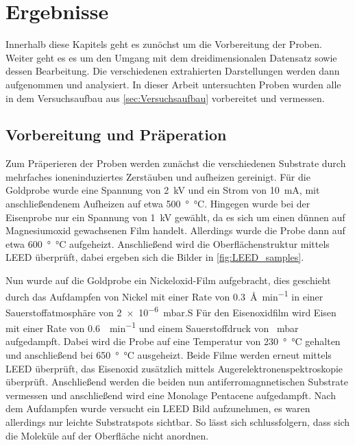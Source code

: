 \chapter{Ergebnisse}
    Innerhalb diese Kapitels geht es zunöchst um die Vorbereitung der Proben.
    Weiter geht es es um den Umgang mit dem dreidimensionalen Datensatz sowie dessen Bearbeitung.
    Die verschiedenen extrahierten Darstellungen werden dann aufgenommen und analysiert.
    In dieser Arbeit untersuchten Proben wurden alle in dem Versuchsaufbau aus \autoref{sec:Versuchsaufbau} vorbereitet und vermessen.

    \section{Vorbereitung und Präperation}
    \label{sec:Praep}
        Zum Präperieren der Proben werden zunächst die verschiedenen Substrate durch mehrfaches ioneninduziertes Zerstäuben und aufheizen gereinigt.
        Für die Goldprobe wurde eine Spannung von \SI{2}{\kilo\volt} und ein Strom von \SI{10}{\milli\ampere}, mit anschließendenem Aufheizen auf etwa \SI{500}{\degree\celsius}.
        Hingegen wurde bei der Eisenprobe nur ein Spannung von \SI{1}{\kilo\volt} gewählt, da es sich um einen dünnen auf Magnesiumoxid gewachsenen Film handelt.
        Allerdings wurde die Probe dann auf etwa \SI{600}{\degree\celsius} aufgeheizt.
        Anschließend wird die Oberflächenstruktur mittels LEED überprüft, dabei ergeben sich die Bilder in \autoref{fig:LEED_samples}.

        Nun wurde auf die Goldprobe ein Nickeloxid-Film aufgebracht, dies geschieht durch das Aufdampfen von Nickel mit einer Rate von \SI{0.3}{\angstrom\per\minute} in einer Sauerstoffatmosphäre von \SI{2e-6}{\milli\bar}.S
        Für den Eisenoxidfilm wird Eisen mit einer Rate von \SI{0.6}{\ML\per\minute} und einem Sauerstoffdruck von \SI{}{\milli\bar} aufgedampft.
        Dabei wird die Probe auf eine Temperatur von \SI{230}{\degree\celsius} gehalten und anschließend bei \SI{650}{\degree\celsius} ausgeheizt.
        Beide Filme werden erneut mittels LEED überprüft, das Eisenoxid zusätzlich mittels Augerelektronenspektroskopie überprüft.
        Anschließend werden die beiden nun antiferromagnnetischen Substrate vermessen und anschließend wird eine Monolage Pentacene aufgedampft.
        Nach dem Aufdampfen wurde versucht ein LEED Bild aufzunehmen, es waren allerdings nur leichte Substratspots sichtbar.
        So lässt sich schlussfolgern, dass sich die Moleküle auf der Oberfläche nicht anordnen.
        

